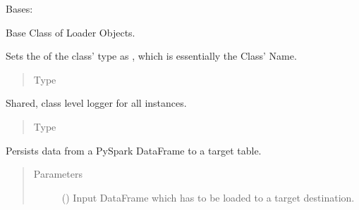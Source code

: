 \documentclass[a4paper,10pt, twoside,english]{sphinxmanual}
\begin{document}
\begin{fulllineitems}
\label{\detokenize{base_classes/loader:spooq2.loader.loader.Loader}}
Bases: 

Base Class of Loader Objects.

\begin{fulllineitems}
\label{\detokenize{base_classes/loader:spooq2.loader.loader.Loader.name}}
Sets the  of the class’ type as , which is essentially the Class’ Name.
\begin{quote}\begin{description}
\item[{Type}] \leavevmode
{}

\end{description}\end{quote}

\end{fulllineitems}


\begin{fulllineitems}
\label{\detokenize{base_classes/loader:spooq2.loader.loader.Loader.logger}}
Shared, class level logger for all instances.
\begin{quote}\begin{description}
\item[{Type}] \leavevmode
{}

\end{description}\end{quote}

\end{fulllineitems}


\begin{fulllineitems}
\label{\detokenize{base_classes/loader:spooq2.loader.loader.Loader.load}}
Persists data from a PySpark DataFrame to a target table.
\begin{quote}\begin{description}
\item[{Parameters}] \leavevmode
{} () \textendash{} Input DataFrame which has to be loaded to a target destination.


\end{description}
\end{quote}
\end{fulllineitems}
\end{fulllineitems}
\end{document}

